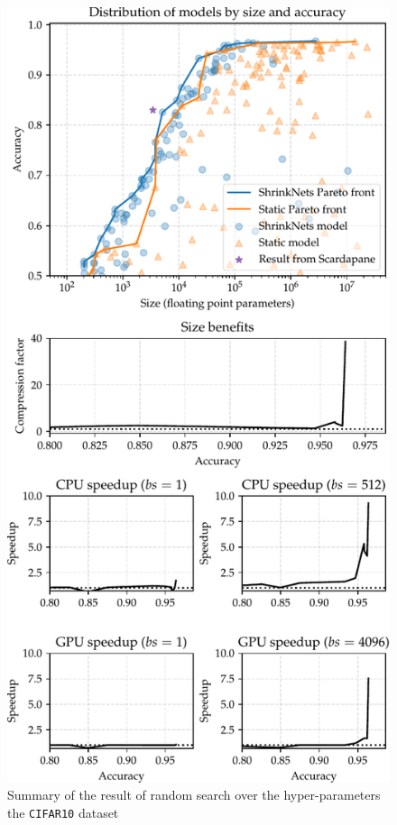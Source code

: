 \begin{figure}[t]
\begin{minipage}{2.7in}
\begin{center}
\vspace*{-5mm}
\caption{\label{figure_CIFAR10} Summary of the result of random
search over the hyper-parameters the \texttt{CIFAR10} dataset}
\end{center}
\vspace*{-4mm}
\end{minipage}
\begin{minipage}{2.7in}
\begin{center}
\includegraphics[width=\columnwidth]{COVER_FC_summary}

\end{center}
\end{minipage}
\end{figure}
